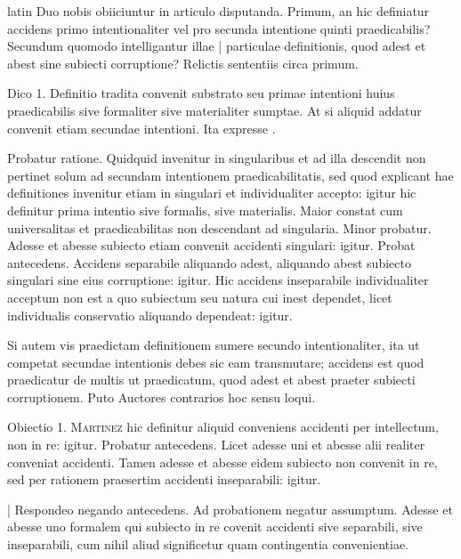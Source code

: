 \begin{otherlanguage*}{latin}
\pstart
Duo nobis obiiciuntur in articulo disputanda. Primum, an hic definiatur accidens primo intentionaliter vel pro secunda intentione quinti praedicabilis? Secundum quomodo intelligantur illae \textnormal{|} particulae definitionis, quod adest et abest sine subiecti corruptione? Relictis sententiis circa primum. 
\pend

\pstart
Dico 1. Definitio tradita convenit substrato seu primae intentioni huius praedicabilis sive formaliter sive materialiter sumptae. At si aliquid addatur convenit etiam secundae intentioni. Ita expresse . 
\pend

\pstart
Probatur ratione. Quidquid invenitur in singularibus et ad illa descendit non pertinet solum ad secundam intentionem praedicabilitatis, sed quod explicant hae definitiones invenitur etiam in singulari et individualiter accepto:
igitur hic definitur prima intentio sive formalis, sive materialis. Maior constat cum universalitas et praedicabilitas non descendant ad singularia. Minor probatur. Adesse et abesse subiecto etiam convenit accidenti singulari:
igitur. Probat antecedens. Accidens separabile aliquando adest, aliquando abest subiecto singulari sine eius corruptione:
igitur. Hic accidens inseparabile individualiter acceptum non est a quo subiectum seu natura cui inest dependet, licet individualis conservatio aliquando dependeat:
igitur. 
\pend

\pstart
Si autem vis praedictam definitionem sumere secundo intentionaliter, ita ut competat secundae intentionis debes sic eam transmutare; accidens est quod praedicatur de multis ut praedicatum, quod adest et abest praeter subiecti corruptionem. Puto Auctores contrarios hoc sensu loqui. 
\pend

\pstart
Obiectio 1. \textsc{Martinez} hic definitur aliquid conveniens accidenti per intellectum, non in re:
igitur. Probatur antecedens. Licet adesse uni et abesse alii realiter conveniat accidenti. Tamen adesse et abesse eidem subiecto non convenit in re, sed per rationem praesertim accidenti inseparabili:
igitur. 
\pend

\pstart
\textnormal{|} Respondeo negando antecedens. Ad probationem negatur assumptum. Adesse et abesse uno formalem qui subiecto in re covenit accidenti sive separabili, sive inseparabili, cum nihil aliud significetur quam contingentia convenientiae. 
\pend


\end{otherlanguage*}
